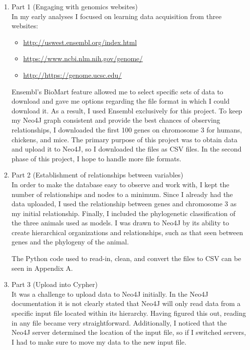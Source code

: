 \documentclass[]{article}
\begin{document}
\begin{enumerate}
\item Part 1 (Engaging with genomics websites)\\
In my early analyses I focused on learning data acquisition from three websites:

\begin{itemize}	
	\item \url{http://uswest.ensembl.org/index.html}
	\item \url{https://www.ncbi.nlm.nih.gov/genome/}
	\item \url{http://https://genome.ucsc.edu/}
\end{itemize}

Ensembl's BioMart feature allowed me to select specific sets of data to download and gave me options regarding the file format in which I could download it.  As a result, I used Ensembl exclusively for this project.  To keep my Neo4J graph consistent and provide the best chances of observing relationships, I downloaded the first 100 genes on chromosome 3 for humans, chickens, and mice.  The primary purpose of this project was to obtain data and upload it to Neo4J, so I downloaded the files as CSV files.  In the second phase of this project, I hope to handle more file formats.



\item Part 2 (Establishment of relationships between variables)\\
In order to make the database easy to observe and work with, I kept the number of relationships and nodes to a minimum.   Since I already had the data uploaded, I used the relationship between genes and chromosome 3 as my initial relationship.  Finally, I included the phylogenetic classification of the three animals used as models. I was drawn to Neo4J by its ability to create hierarchical organizations and relationships, such as that seen between genes and the phylogeny of the animal.




The Python code used to read-in, clean, and convert the files to CSV can be seen in Appendix A.



\item Part 3 (Upload into Cypher)\\
It was a challenge to upload data to Neo4J initially.  In the Neo4J documentation it is not clearly stated that Neo4J will only read data from a specific input file located within its hierarchy.  Having figured this out, reading in any file became very straightforward.  Additionally, I noticed that the Neo4J server determined the location of the input file, so if I switched servers, I had to make sure to move my data to the new input file.



\end{enumerate}
\end{document}
